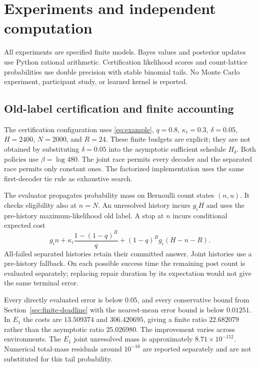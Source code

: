 \section{Experiments and independent computation}
\label{sec:experiments}
All experiments are specified finite models. Bayes values and posterior updates
use Python rational arithmetic. Certification likelihood scores and count-lattice
probabilities use double precision with stable binomial tails. No Monte Carlo
experiment, participant study, or learned kernel is reported.

\subsection{Old-label certification and finite accounting}
The certification configuration uses \eqref{eq:example}, $q=0.8$,
$\kappa_i=0.3$, $\delta=0.05$, $H=2400$, $N=2000$, and $R=24$.
These finite budgets are explicit; they are not obtained by substituting
$\delta=0.05$ into the asymptotic sufficient schedule $H_\delta$.
Both policies use $\beta=\log480$. The joint race permits every decoder and
the separated race permits only constant ones. The factorized implementation
uses the same first-decoder tie rule as exhaustive search.

The evaluator propagates probability mass on Bernoulli count states $(n,u)$.
It checks eligibility also at $n=N$. An unresolved history incurs $g_iH$
and uses the pre-history maximum-likelihood old label. A stop at $n$ incurs
conditional expected cost
\[
g_i n+\kappa_i\frac{1-(1-q)^R}{q}
+(1-q)^R g_i(H-n-R).
\]
All-failed separated histories retain their committed answer. Joint histories
use a pre-history fallback. On each possible success time the remaining
post count is evaluated separately; replacing repair duration by its
expectation would not give the same terminal error.

\begin{table}[ht]
\centering\small
\caption{Finite count-lattice evaluation of old-label certification. Displayed
errors and timeout masses are floating-point values. Every total cost includes
failed attempts and unrepaired tails.}\label{tab:finite}
\end{table}
Every directly evaluated error is below $0.05$, and every conservative bound
from Section~\ref{sec:finite-deadline} with the nearest-mean error bound is
below $0.01251$. In $E_1$ the costs are $13.509374$ and $306.420695$, giving
a finite ratio $22.682079$ rather than the asymptotic ratio $25.026980$.
The improvement varies across environments. The $E_1$ joint unresolved
mass is approximately $8.71\times10^{-152}$. Numerical total-mass residuals
around $10^{-16}$ are reported separately and are not substituted for this
tail probability.

